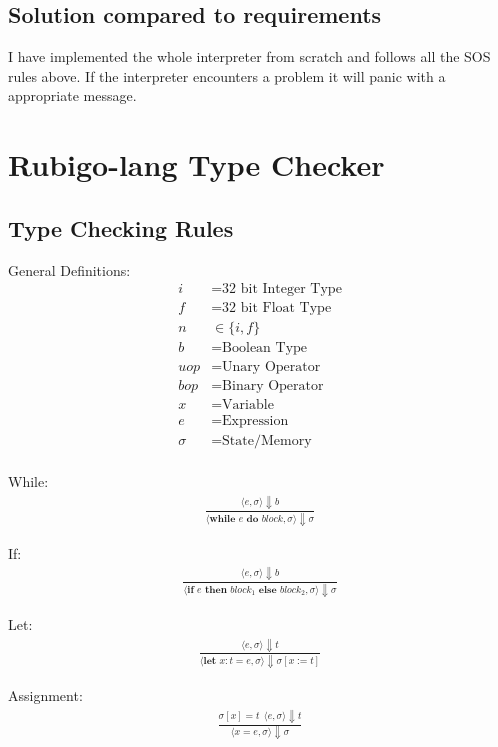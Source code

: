 \documentclass[12pt]{article}
\begin{document}
    \subsection{Solution compared to requirements}
	I have implemented the whole interpreter from scratch and follows all the SOS rules above. If the interpreter encounters a problem it will panic with a appropriate message. 



    \section{Rubigo-lang Type Checker}	
    	\subsection{Type Checking Rules}
	General Definitions:
    	\begin{align*}
		i &= \text{32 bit Integer Type} \\
		f &= \text{32 bit Float Type} \\
		n &\in \{i, f\} \\
		b &= \text{Boolean Type} \\
		uop &= \text{Unary Operator} \\
		bop &= \text{Binary Operator} \\
		x &= \text{Variable} \\
		e &= \text{Expression} \\
		\sigma &= \text{State/Memory} \\
	\end{align*}

	While:
	\begin{align*}
		\frac{\langle e, \sigma \rangle\Downarrow b}
		{\langle \textbf{while } e \textbf{ do } block, \sigma \rangle\Downarrow \sigma}
	\end{align*}

	If:
	\begin{align*}
		\frac{\langle e, \sigma \rangle\Downarrow b}
		{\langle \textbf{if } e \textbf{ then } block_1 \textbf{ else } block_2, \sigma \rangle\Downarrow \sigma}
	\end{align*}

	Let:
	\begin{align*}
		\frac{\langle e, \sigma \rangle\Downarrow t}
		{\langle \textbf{let } x: t = e, \sigma \rangle\Downarrow \sigma [x := t]}
	\end{align*}

	Assignment:
	\begin{align*}
		\frac{ \sigma[x] = t \ \ 
			\langle e, \sigma \rangle\Downarrow t}
		{\langle x = e, \sigma \rangle\Downarrow \sigma}
	\end{align*}
\end{document}
